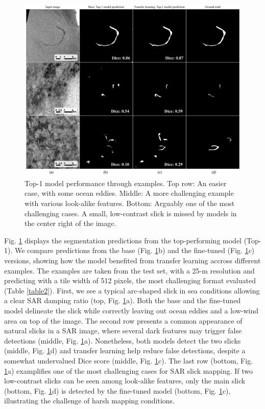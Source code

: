 \documentclass[lettersize,journal]{IEEEtran}
\begin{document}
\begin{figure}[!t]
    \centering
    \includegraphics[width=6.02in]{figures/preds4x3_v2_scale_lettering.png}
    \caption{Top-1 model performance through examples. \quad Top row: An easier case, with some ocean eddies. \quad Middle: A more challenging example with 
    various look-alike features. \quad Bottom: Arguably one of the most challenging cases. A small, low-contrast slick is missed by models in the center right of the image.}
    \label{figure3}
\end{figure}
Fig. \ref{figure3} displays the segmentation predictions from the top-performing model (Top-1). We compare predictions from the base (Fig. \ref{figure3}b) and the fine-tuned (Fig. \ref{figure3}c)
versions, showing how the model benefited from transfer learning accross different examples. The examples are taken from the test set, with a 25-m resolution and predicting 
with a tile width of 512 pixels, the most challenging format evaluated (Table \ref{table2}). First, we see a typical arc-shaped slick in sea conditions allowing a clear SAR damping ratio (top, Fig. \ref{figure3}a). 
Both the base and the fine-tuned model delineate the slick while correctly leaving out ocean eddies and a low-wind area on top of the image. The second row presents a common appearance 
of natural slicks in a SAR image, where several dark features may trigger false detections (middle, Fig. \ref{figure3}a). Nonetheless, both models detect the two slicks (middle, Fig. \ref{figure3}d) and transfer learning 
help reduce false detections, despite a somewhat undervalued Dice score (middle, Fig. \ref{figure3}c). The last row (bottom, Fig. \ref{figure3}a) examplifies one of the most challenging cases for SAR slick mapping. 
If two low-contrast slicks can be seen among look-alike features, only the main slick (bottom, Fig. \ref{figure3}d) is detected by the fine-tuned model (bottom, Fig. \ref{figure3}c), 
illustrating the challenge of harsh mapping conditions. 
\end{document}

